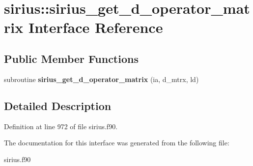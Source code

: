 \hypertarget{interfacesirius_1_1sirius__get__d__operator__matrix}{}\section{sirius\+:\+:sirius\+\_\+get\+\_\+d\+\_\+operator\+\_\+matrix Interface Reference}
\label{interfacesirius_1_1sirius__get__d__operator__matrix}
\subsection*{Public Member Functions}
\begin{DoxyCompactItemize}
\item 
\hypertarget{interfacesirius_1_1sirius__get__d__operator__matrix_a517de7e0a97ccccb1bfa3946d30f77e5}{}subroutine {\bfseries sirius\+\_\+get\+\_\+d\+\_\+operator\+\_\+matrix} (ia, d\+\_\+mtrx, ld)\label{interfacesirius_1_1sirius__get__d__operator__matrix_a517de7e0a97ccccb1bfa3946d30f77e5}

\end{DoxyCompactItemize}


\subsection{Detailed Description}


Definition at line 972 of file sirius.\+f90.



The documentation for this interface was generated from the following file\+:\begin{DoxyCompactItemize}
\item 
sirius.\+f90\end{DoxyCompactItemize}
